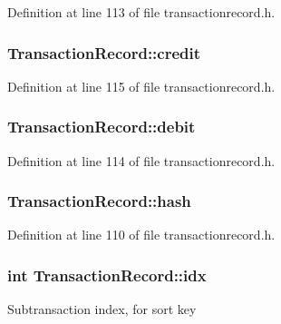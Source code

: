 Definition at line 113 of file transactionrecord.\+h.

\hypertarget{class_transaction_record_aea9d8e5ead391ada02422cef6f45d9c7}{}
\subsubsection[{credit}]{ Transaction\+Record\+::credit}\label{class_transaction_record_aea9d8e5ead391ada02422cef6f45d9c7}


Definition at line 115 of file transactionrecord.\+h.

\hypertarget{class_transaction_record_a536fdaa56c7f7fb789f064cc475d30c1}{}
\subsubsection[{debit}]{ Transaction\+Record\+::debit}\label{class_transaction_record_a536fdaa56c7f7fb789f064cc475d30c1}


Definition at line 114 of file transactionrecord.\+h.

\hypertarget{class_transaction_record_a7a89b1316eb6e7c14be17cb8448ae586}{}
\subsubsection[{hash}]{ Transaction\+Record\+::hash}\label{class_transaction_record_a7a89b1316eb6e7c14be17cb8448ae586}


Definition at line 110 of file transactionrecord.\+h.

\hypertarget{class_transaction_record_a143da419e3dc0bc2ec73e22b3a56d1c9}{}
\subsubsection[{idx}]{\setlength{\rightskip}{0pt plus 5cm}int Transaction\+Record\+::idx}\label{class_transaction_record_a143da419e3dc0bc2ec73e22b3a56d1c9}
Subtransaction index, for sort key 

